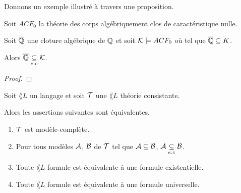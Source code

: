\documentclass[a4paper, 12pt]{report}
\begin{document}
Donnons un exemple illustré à travers une proposition.

\begin{proposition}
	Soit $ACF_{0}$ la théorie des corps algébriquement clos de caractéristique nulle.

	Soit $\overline{\mathbb{Q}}$ une cloture algébrique de $\mathbb{Q}$ et soit
	$\mathcal{K} \models ACF_{0}$ où tel que $\overline{\mathbb{Q}}
	\subseteq K$.

	Alors $\overline{\mathbb{Q}} \underset{e.c}{\subseteq} \mathcal{K}$.
\end{proposition}

\ifdefined\outputproof
\begin{proof}

\end{proof}
\fi

\begin{theorem}
	Soit $\lang{L}$ un langage et soit $\mathcal{T}$ une $\lang{L}$ théorie consistante.

	Alors les assertions suivantes sont équivalentes.

	\begin{enumerate}
		\item \label{statement:modele_complete} $\mathcal{T}$ est modèle-complète.
		\item \label{statement:existentiallyClosed} Pour tous modèles $\mathcal{A}$, $\mathcal{B}$ de $\mathcal{T}$ tel
			que $\mathcal{A} \subseteq \mathcal{B}$, $\mathcal{A}
			\underset{e.c}{\subseteq} \mathcal{B}$.
		\item \label{statement:equiv_existentielle} Toute $\lang{L}$ formule est équivalente à une formule existentielle.
		\item \label{statement:equiv_universelle} Toute $\lang{L}$ formule est équivalente à une formule
			universelle.
	\end{enumerate}
\end{theorem}
\end{document}
